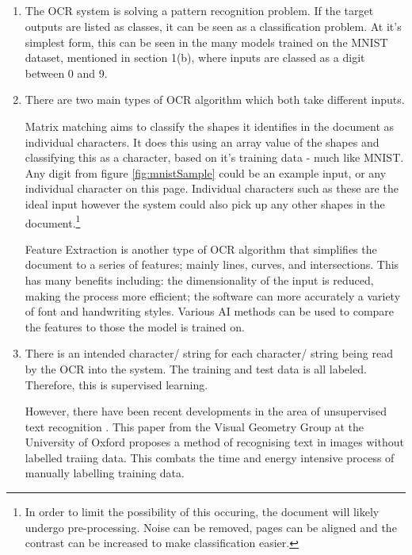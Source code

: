 \documentclass[a4paper]{report}
\begin{document}
\subsection{}
\begin{enumerate}
    \renewcommand{\theenumi}{\roman{enumi}}
    \item The OCR system is solving a pattern recognition problem. If the target outputs are listed as classes, it can be seen as a classification problem. At it's simplest form, this can be seen in the many models trained on the MNIST dataset, mentioned in section 1(b), where inputs are classed as a digit between 0 and 9.

    \item There are two main types of OCR algorithm which both take different inputs.

          Matrix matching aims to classify the shapes it identifies in the document as individual characters. It does this using an array value of the shapes and classifying this as a character, based on it's training data - much like MNIST. Any digit from figure \ref{fig:mnistSample} could be an example input, or any individual character on this page. Individual characters such as these are the ideal input however the system could also pick up any other shapes in the document.\footnote{In order to limit the possibility of this occuring, the document will likely undergo pre-processing. Noise can be removed, pages can be aligned and the contrast can be increased to make classification easier.}

          Feature Extraction is another type of OCR algorithm that simplifies the document to a series of features; mainly lines, curves, and intersections. This has many benefits including: the dimensionality of the input is reduced, making the process more efficient; the software can more accurately a variety of font and handwriting styles. Various AI methods can be used to compare the features to those the model is trained on.

    \item There is an intended character/ string for each character/ string being read by the OCR into the system. The training and test data is all labeled. Therefore, this is supervised learning.

          However, there have been recent developments in the area of unsupervised text recognition \cite{unsupervisedTxt}. This paper from the Visual Geometry Group
          at the University of Oxford proposes a method of recognising text in images without labelled traiing data. This combats the time and energy intensive process of manually labelling training data.


\end{enumerate}
\end{document}
